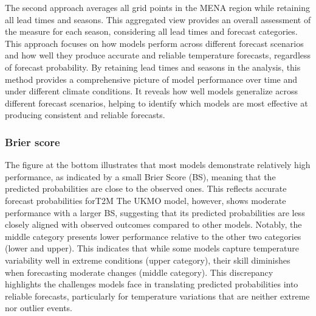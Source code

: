 The second approach averages all grid points in the MENA region while retaining all lead times and seasons. This aggregated view provides an overall assessment of the measure for each season, considering all lead times and forecast categories. This approach focuses on how models perform across different forecast scenarios and how well they produce accurate and reliable temperature forecasts, regardless of forecast probability. By retaining lead times and seasons in the analysis, this method provides a comprehensive picture of model performance over time and under different climate conditions. It reveals how well models generalize across different forecast scenarios, helping to identify which models are most effective at producing consistent and reliable forecasts.
\subsubsection{Brier score}

The figure at the bottom illustrates that most models demonstrate relatively high performance, as indicated by a small Brier Score (BS), meaning that the predicted probabilities are close to the observed ones. This reflects accurate forecast probabilities forT2M The UKMO model, however, shows moderate performance with a larger BS, suggesting that its predicted probabilities are less closely aligned with observed outcomes compared to other models. Notably, the middle category presents lower performance relative to the other two categories (lower and upper). This indicates that while some models capture temperature variability well in extreme conditions (upper category), their skill diminishes when forecasting moderate changes (middle category). This discrepancy highlights the challenges models face in translating predicted probabilities into reliable forecasts, particularly for temperature variations that are neither extreme nor outlier events. 


